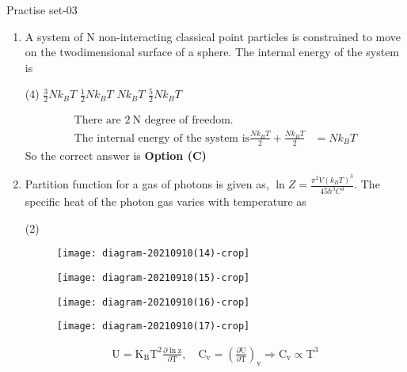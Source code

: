 \newpage
\begin{abox}
	Practise set-03
\end{abox}
\begin{enumerate}
	\item A system of $\mathrm{N}$ non-interacting classical point particles is constrained to move on the twodimensional surface of a sphere. The internal energy of the system is
	{}
\begin{tasks}(4)
\task[\textbf{A.}] $\frac{3}{2} N k_{B} T$
\task[\textbf{B.}] $\frac{1}{2} N k_{B} T$
\task[\textbf{C.}] $N k_{B} T$
\task[\textbf{D.}] $\frac{5}{2} N k_{B} T$
\end{tasks}
\begin{answer}
\begin{align*}
\text{There are $2 \mathrm{~N}$ degree of freedom.}\\
\text{The internal energy of the system is}\frac{N k_{B} T}{2}+\frac{N k_{B} T}{2}&=N k_{B} T
\end{align*}
So the correct answer is \textbf{Option (C)}
\end{answer}
\item Partition function for a gas of photons is given as, $\ln Z=\frac{\pi^{2} V\left(k_{B} T\right)^{3}}{45 \hbar^{3} C^{3}}$. The specific heat of the photon gas varies with temperature as
{}
\begin{tasks}(2)
\task[\textbf{A.}] \begin{figure}[H]
	\centering
	\texttt{[image: diagram-20210910(14)-crop]}
\end{figure}
\task[\textbf{B.}] \begin{figure}[H]
	\centering
	\texttt{[image: diagram-20210910(15)-crop]}
\end{figure}
\task[\textbf{C.}] \begin{figure}[H]
	\centering
	\texttt{[image: diagram-20210910(16)-crop]}
\end{figure}
\task[\textbf{D.}] \begin{figure}[H]
	\centering
	\texttt{[image: diagram-20210910(17)-crop]}
\end{figure}
\end{tasks}
\begin{answer}
\begin{align*}
\mathrm{U}=\mathrm{K}_{\mathrm{B}} \mathrm{T}^{2} \frac{\partial \ln \mathrm{z}}{\partial \mathrm{T}}, \quad \mathrm{C}_{\mathrm{v}}=\left(\frac{\partial \mathrm{U}}{\partial \mathrm{T}}\right)_{\mathrm{v}} \Rightarrow \mathrm{C}_{\mathrm{v}} \propto \mathrm{T}^{3}

\end{align*}
\end{answer}
\end{enumerate}
